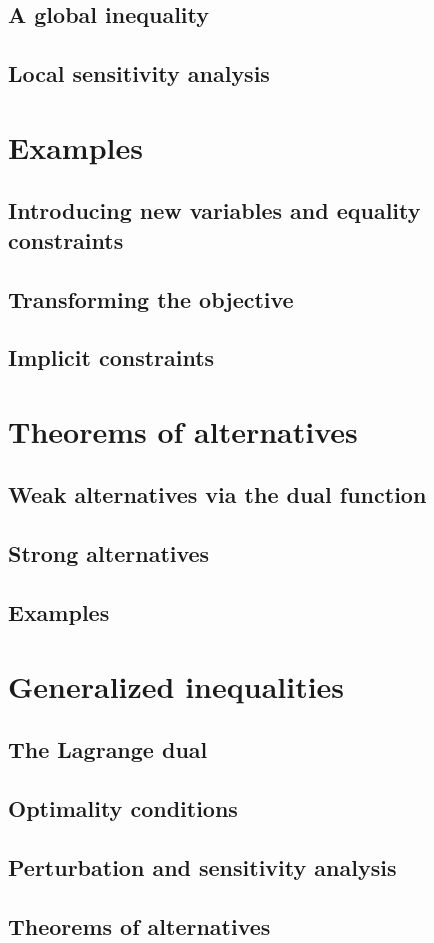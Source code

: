 \subsection{A global inequality}
\subsection{Local sensitivity analysis}

\section{Examples}
\subsection{Introducing new variables and equality constraints}
\subsection{Transforming the objective}
\subsection{Implicit constraints}

\section{Theorems of alternatives}
\subsection{Weak alternatives via the dual function}
\subsection{Strong alternatives}
\subsection{Examples}

\section{Generalized inequalities}
\subsection{The Lagrange dual}
\subsection{Optimality conditions}
\subsection{Perturbation and sensitivity analysis}
\subsection{Theorems of alternatives}
